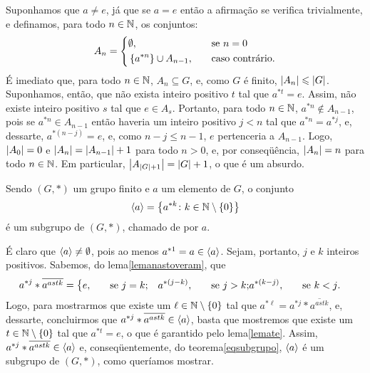\begin{dem}
  Suponhamos que $a\neq e$, já que se $a=e$ então a afirmação se
  verifica trivialmente, e definamos, para todo $n\in\mathbb{N}$, os
  conjuntos:
  \begin{equation*}
    A_n = \left\{
    \begin{aligned}
      &\emptyset\mathrm{,}&\quad&\text{se $n=0$}\\
      &\left\{ a^{\ast n} \right\}\cup A_{n-1}\mathrm{,}&\quad&\text{caso contrário.}
    \end{aligned}
    \right.
  \end{equation*}
  É imediato que, para todo $n\in\mathbb{N}$, $A_n\subseteq G$, e, como $G$ é
  finito, $\left| A_n \right|\leqslant \left| G \right|$.
  Suponhamos, então, que não exista inteiro
  positivo $t$ tal que $a^{\ast t} = e$. Assim, não existe inteiro
  positivo $s$ tal que $e\in A_s$. Portanto, para todo $n\in\mathbb{N}$,
  $a^{\ast n}\notin A_{n-1}$, pois se $a^{\ast n}\in A_{n-1}$ então
  haveria um inteiro positivo $j<n$ tal que $a^{\ast n}=a^{\ast j}$, e,
  dessarte, $a^{\ast (n-j)}=e$, e, como $n-j\leq n-1$, $e$ pertenceria a
  $A_{n-1}$. Logo, $\left| A_0 \right|=0$ e
  $\left| A_n \right|=\left| A_{n-1} \right|+1$ para todo $n>0$, e, por conseqüência,
  $\left| A_n \right|=n$ para todo $n\in\mathbb{N}$. Em particular,
  $\left| A_{\left| G \right|+1} \right|=\left| G \right|+1$, o que é um absurdo.
\end{dem}

\begin{Teo}\label{teogeradoasubgrupo}
  Sendo $(G,\ast)$ um grupo finito
  e $a$ um elemento de $G$, o conjunto
  \begin{equation*}
    \simb[subgrupo gerado por $a$]{\gerado{a}} = \cjpp{a^{\ast
    k}}{k\in\MMN\setminus\cj{0}}
  \end{equation*}
  é um subgrupo de $(G,\ast)$, chamado de  por $a$.
\end{Teo}

\begin{dem}
  É claro que $\langle a\rangle\neq\emptyset$, pois ao menos $a^{\ast
  1}=a\in\langle a\rangle$. Sejam, portanto, $j$ e $k$ inteiros
  positivos. Sabemos, do lema\xspace\ref{lemanastoveram}, que
  \begin{equation*}
    a^{\ast j}\ast \overline{a^{ast k}} =\left\{
    \begin{aligned}
      &e\mathrm{,}&\quad&\text{se $j=k$;}
      &a^{\ast (j-k)}\mathrm{,}&\quad&\text{se $j>k$;}
      &a^{\ast (k-j)}\mathrm{,}&\quad&\text{se $k<j$.}
    \end{aligned}
    \right.
  \end{equation*}
  Logo, para mostrarmos que existe um $\ell\in\mathbb{N}\setminus\left\{ 0 \right\}$ tal
  que $a^{\ast \ell}=a^{\ast j}\ast \overline{a^{ast k}}$, e, dessarte,
  concluirmos que $a^{\ast j}\ast \overline{a^{ast k}}\in\langle a\rangle$,
  basta que mostremos que existe um $t\in\mathbb{N}\setminus\left\{ 0 \right\}$
  tal que $a^{\ast t}=e$, o que é garantido pelo
  lema\xspace\ref{lemate}. Assim, $a^{\ast j}\ast \overline{a^{ast
  k}}\in\langle a\rangle$ e, conseqüentemente, do
  teorema\xspace\ref{eqsubgrupo}, $\langle a\rangle$ é um subgrupo de
  $(G,\ast)$, como queríamos mostrar.
\end{dem}

